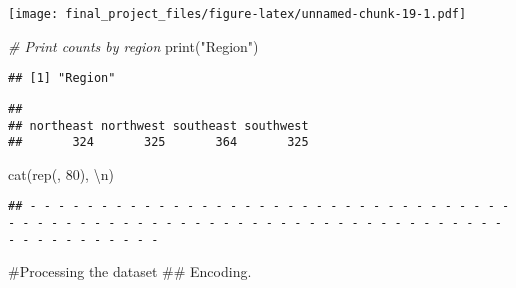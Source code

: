 \documentclass[
]{article}
\newenvironment{Shaded}{\begin{snugshade}}{\end{snugshade}}
\newcommand{\CommentTok}[1]{\textcolor[rgb]{0.56,0.35,0.01}{\textit{#1}}}
\newcommand{\DecValTok}[1]{\textcolor[rgb]{0.00,0.00,0.81}{#1}}
\newcommand{\FunctionTok}[1]{\textcolor[rgb]{0.00,0.00,0.00}{#1}}
\newcommand{\NormalTok}[1]{#1}
\newcommand{\OtherTok}[1]{\textcolor[rgb]{0.56,0.35,0.01}{#1}}
\newcommand{\SpecialCharTok}[1]{\textcolor[rgb]{0.00,0.00,0.00}{#1}}
\newcommand{\StringTok}[1]{\textcolor[rgb]{0.31,0.60,0.02}{#1}}
\begin{document}
\texttt{[image: final\_project\_files/figure-latex/unnamed-chunk-19-1.pdf]}

\begin{Shaded}
\begin{Highlighting}[]
\CommentTok{\# Print counts by region}
\FunctionTok{print}\NormalTok{(}\StringTok{"Region"}\NormalTok{)}
\end{Highlighting}
\end{Shaded}

\begin{verbatim}
## [1] "Region"
\end{verbatim}

\begin{Shaded}
\end{Shaded}

\begin{verbatim}
## 
## northeast northwest southeast southwest 
##       324       325       364       325
\end{verbatim}

\begin{Shaded}
\begin{Highlighting}[]
\FunctionTok{cat}\NormalTok{(}\FunctionTok{rep}\NormalTok{(}\StringTok{\textquotesingle{}{-}\textquotesingle{}}\NormalTok{, }\DecValTok{80}\NormalTok{), }\StringTok{\textquotesingle{}}\SpecialCharTok{\textbackslash{}n}\StringTok{\textquotesingle{}}\NormalTok{)}
\end{Highlighting}
\end{Shaded}

\begin{verbatim}
## - - - - - - - - - - - - - - - - - - - - - - - - - - - - - - - - - - - - - - - - - - - - - - - - - - - - - - - - - - - - - - - - - - - - - - - - - - - - - - - -
\end{verbatim}

\#Processing the dataset \#\# Encoding.
\end{document}
